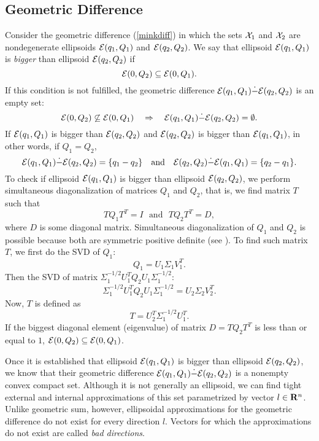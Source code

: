 \subsection{Geometric Difference}
Consider the geometric difference (\ref{minkdiff}) in which the sets $\XX_1$ and
$\XX_2$ are nondegenerate ellipsoids $\EE(q_1,Q_1)$ and $\EE(q_2,Q_2)$.
We say that ellipsoid $\EE(q_1,Q_1)$ is {\it bigger} than ellipsoid
$\EE(q_2,Q_2)$ if
\[ \EE(0,Q_2) \subseteq \EE(0,Q_1). \]
If this condition is not fulfilled,  the geometric difference
$\EE(q_1,Q_1)\dot{-}\EE(q_2,Q_2)$ is an empty set:
\[ \EE(0,Q_2) \not\subseteq \EE(0,Q_1) ~~~ \Rightarrow ~~~
\EE(q_1,Q_1) \dot{-}\EE(q_2,Q_2) = \emptyset. \]
If $\EE(q_1,Q_1)$ is bigger than $\EE(q_2,Q_2)$ and
$\EE(q_2,Q_2)$ is bigger than $\EE(q_1,Q_1)$, in other words, if $Q_1=Q_2$,
\[ \EE(q_1,Q_1) \dot{-}\EE(q_2,Q_2) = \{q_1-q_2\} ~~~ \mbox{and} ~~~
\EE(q_2,Q_2) \dot{-}\EE(q_1,Q_1) = \{q_2-q_1\}. \]
To check if ellipsoid $\EE(q_1,Q_1)$ is bigger than ellipsoid $\EE(q_2,Q_2)$,
we perform simultaneous diagonalization of matrices $Q_1$ and $Q_2$, that is,
we find matrix $T$ such that
\[ TQ_1T^T = I ~~~ \mbox{and} ~~~ TQ_2T^T=D, \]
where $D$ is some diagonal matrix.
Simultaneous diagonalization of $Q_1$ and $Q_2$ is possible
because both are symmetric positive definite (see \cite{gant}).
To find such matrix $T$, we first do the SVD of $Q_1$:
\begin{equation}
Q_1 = U_1\Sigma_1V_1^T . \label{simdiag1}
\end{equation}
Then the SVD of matrix $\Sigma_1^{-1/2}U_1^TQ_2U_1\Sigma_1^{-1/2}$:
\begin{equation}
\Sigma_1^{-1/2}U_1^TQ_2U_1\Sigma_1^{-1/2} = U_2\Sigma_2V_2^T. \label{simdiag2}
\end{equation}
Now, $T$ is defined as
\begin{equation}
T = U_2^T \Sigma_1^{-1/2}U_1^T.  \label{simdiag3}
\end{equation}
If the biggest diagonal element (eigenvalue) of matrix $D=TQ_2T^T$ is less than
or equal to $1$,  $\EE(0,Q_2)\subseteq\EE(0,Q_1)$.

Once it is established that ellipsoid $\EE(q_1,Q_1)$ is bigger than
ellipsoid $\EE(q_2,Q_2)$, we know that their geometric difference
$\EE(q_1,Q_1)\dot{-}\EE(q_2,Q_2)$ is a nonempty convex compact set.
Although  it is not generally an ellipsoid, we can find tight external
and internal approximations of this set parametrized by vector $l\in{\bf R}^n$.
Unlike geometric sum, however, ellipsoidal approximations for the geometric
difference do not exist  for every direction $l$.
Vectors for which the approximations do not exist are called
{\it bad directions}.

